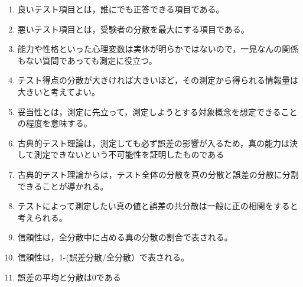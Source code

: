 \begin{enumerate}
	\item 良いテスト項目とは，誰にでも正答できる項目である。
	\item 悪いテスト項目とは，受験者の分散を最大にする項目である。
	\item 能力や性格といった心理変数は実体が明らかではないので，一見なんの関係もない質問であっても測定に役立つ。
	\item テスト得点の分散が大きければ大きいほど，その測定から得られる情報量は大きいと考えてよい。
	\item 妥当性とは，測定に先立って，測定しようとする対象概念を想定できることの程度を意味する。
	\item 古典的テスト理論は，測定しても必ず誤差の影響が入るため，真の能力は決して測定できないという不可能性を証明したものである
	\item 古典的テスト理論からは，テスト全体の分散を真の分散と誤差の分散に分割できることが導かれる。
	\item テストによって測定したい真の値と誤差の共分散は一般に正の相関をすると考えられる。
	\item 信頼性は，全分散中に占める真の分散の割合で表される。
	\item 信頼性は，1-(誤差分散/全分散）で表される。
	\item 誤差の平均と分散は0である
\end{enumerate}
